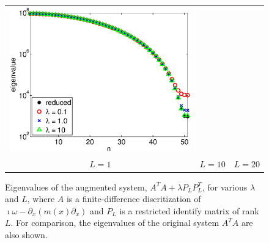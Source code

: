 \documentclass{iopart}
\begin{document}
\begin{figure}
\begin{tabular}{ccc}
\includegraphics[scale=.2]{./figs/example2_c}\\
{\small $L = 1$}&{\small $L = 10$}&{\small $L = 20$}\\
\end{tabular}
\caption{Eigenvalues of the augmented system,  $A^TA + \lambda P_LP_L^T$, for various $\lambda$ and $L$, where $A$ is a finite-difference discritization of $\imath\omega - \partial_x\left(m(x)\partial_x\right)$
and $P_L$ is a restricted identify matrix of rank $L$. For comparison, the eigenvalues of the original system $A^TA$ are also shown.}
\label{fig:example2}
\end{figure}
\end{document}
